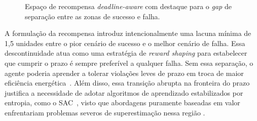 \begin{figure}[htb]
{%
}
\caption{Espaço de recompensa \textit{deadline-aware} com destaque para o \textit{gap} de separação entre as zonas de sucesso e falha.}
\label{fig:recompensa-deadline}
\end{figure}


A formulação da recompensa introduz intencionalmente uma lacuna mínima de 1,5 unidades entre o pior cenário de sucesso e o melhor cenário de falha. Essa descontinuidade atua como uma estratégia de \textit{reward shaping} para estabelecer que cumprir o prazo é sempre preferível a qualquer falha. Sem essa separação, o agente poderia aprender a tolerar violações leves de prazo em troca de maior eficiência energética~\cite{ng1999policy}. Além disso, essa transição abrupta na fronteira do prazo justifica a necessidade de adotar algoritmos de aprendizado estabilizados por entropia, como o \gls{SAC}~\cite{haarnoja2018sac}, visto que abordagens puramente baseadas em valor enfrentariam problemas severos de superestimação nessa região \cite{miriyala2026}.


